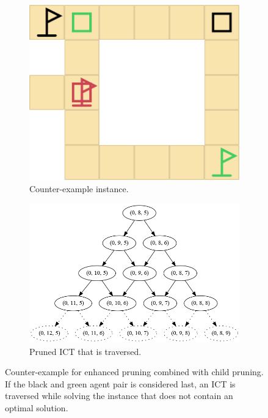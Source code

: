 \documentclass[english]{article}
\begin{document}
	\begin{figure}[H]
		\centering
		\begin{subfigure}{0.40\textwidth}
			\centering
			\includegraphics[width=\linewidth]{img/counter-example-ep-2}
			\caption{Counter-example instance.}
			\label{fig:counter-example:a}
		\end{subfigure}
		\begin{subfigure}{0.49\textwidth}
			\centering
			\includegraphics[width=\linewidth]{img/counter-example-tree}
			\caption{Pruned ICT that is traversed.}
			\label{fig:counter-example:b}
		\end{subfigure}
		\caption{Counter-example for enhanced pruning combined with child pruning. If the black and green agent pair is considered last, an ICT is traversed while solving the instance that does not contain an optimal solution.}
		\label{fig:counter-example}
	\end{figure}
\end{document}
